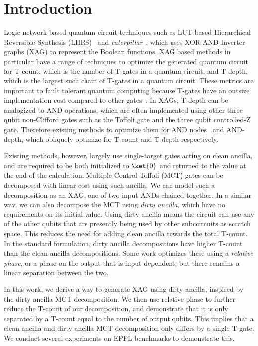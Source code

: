 \section{Introduction}
\label{Intro}

Logic network based quantum circuit techniques such as LUT-based Hierarchical Reversible
Synthesis (LHRS)~\cite{bib-lhrs-soeken} and \emph{caterpillar}~\cite{bib-meuli-ros}, which
uses XOR-AND-Inverter graphs (XAG) to represent the Boolean functions. XAG based methods
in particular have a range of techniques to optimize the generated quantum circuit for
T-count, which is the number of T-gates in a quantum circuit, and T-depth, which is the
largest such chain of T-gates in a quantum circuit. These metrics are important to fault
tolerant quantum computing because T-gates have an outsize implementation cost compared
to other gates~\cite{bib-bravyi-kitaev-magic-distillation}. In XAGs, T-depth can be
analogized to AND operations, which are often implemented using other three qubit
non-Clifford gates such as the Toffoli gate and the three qubit controlled-Z gate.
Therefore existing methods to optimize them for AND nodes~\cite{bib-meuli-mult} and
AND-depth\cite{bib-meuli-ros}, which obliquely optimize for T-count and T-depth
respectively.

Existing methods, however, largely use single-target gates acting on clean ancilla,
and are required to be both initialized to $\ket{0}$ and returned to the value at the end
of the calculation. Multiple Control Toffoli (MCT) gates can be decomposed with linear cost
using such ancilla. We can model such a decomposition as an XAG, one of two-input ANDs
chained together. In a similar way, we can also decompose the MCT using \emph{dirty ancilla},
which have no requirements on its initial value. Using dirty ancilla means the circuit
can use any of the other qubits that are presently being used by other subccircuits as
scratch space. This reduces the need for adding clean ancilla towards the total T-count.
In the standard formulation, dirty ancilla decompositions have higher T-count than the
clean ancilla decompositions. Some work optimizes these using a \emph{relative phase},
or a phase on the output that is input dependent, but there remains a linear separation
between the two.

In this work, we derive a way to generate XAG using dirty ancilla, inspired by the dirty
ancilla MCT decomposition. We then use relative phase to further reduce the T-count of
our decomposition, and demonstrate that it is only separated by a T-count equal to the
number of output qubits. This implies that a clean ancilla and dirty ancilla MCT
decomposition only differs by a single T-gate. We conduct several experiments on
EPFL benchmarks to demonstrate this.

